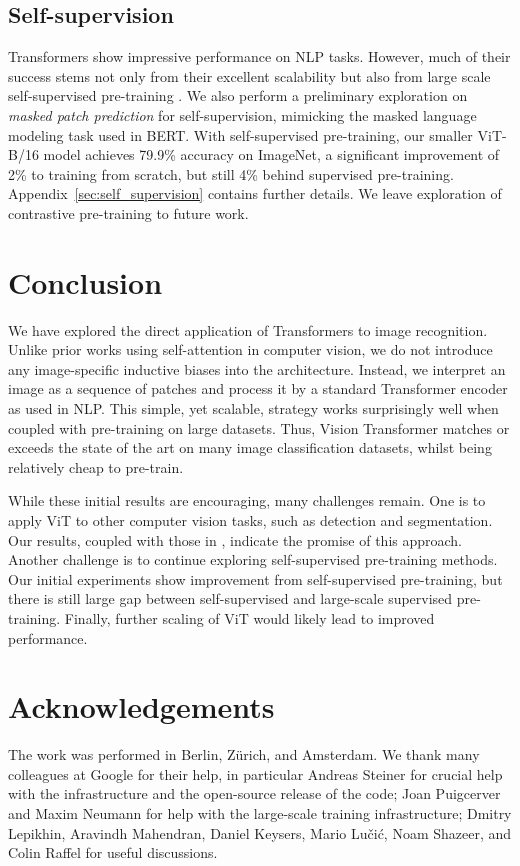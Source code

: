 \documentclass{article} \usepackage{iclr2021_conference,times}
\newcommand{\oursabbrv}{ViT\xspace}
\newcommand{\oursfull}{Vision Transformer\xspace}
\newcommand{\imagenet}{ImageNet\xspace}
\begin{document}
\subsection{Self-supervision}
Transformers show impressive performance on NLP tasks. However, much of their success stems not only from their excellent scalability but also from large scale self-supervised pre-training \citep{devlin19-bert,radford2018-gpt}. We also perform a preliminary exploration on \textit{masked patch prediction} for self-supervision, mimicking the masked language modeling task used in BERT. With self-supervised pre-training, our smaller \oursabbrv-B/16 model achieves 79.9\% accuracy on \imagenet{}, a significant improvement of 2\% to training from scratch, but still 4\% behind supervised pre-training. Appendix~\ref{sec:self_supervision} contains further details.
We leave exploration of contrastive pre-training \citep{Chen2020simclr,he2020moco,bachman2019amdim,henaff2020cpc} to future work.




 \section{Conclusion}

We have explored the direct application of Transformers to image recognition.
Unlike prior works using self-attention in computer vision, we do not introduce any image-specific inductive biases into the architecture.
Instead, we interpret an image as a sequence of patches and process it by a standard Transformer encoder as used in NLP.
This simple, yet scalable, strategy works surprisingly well when coupled with pre-training on large datasets.
Thus, \oursfull matches or exceeds the state of the art on many image classification datasets, whilst being relatively cheap to pre-train.

While these initial results are encouraging, many challenges remain.
One is to apply \oursabbrv to other computer vision tasks, such as detection and segmentation.
Our results, coupled with those in \citet{carion20-detr}, indicate the promise of this approach.
Another challenge is to continue exploring self-supervised pre-training methods.
Our initial experiments show improvement from self-supervised pre-training, but there is still large gap between self-supervised and large-scale supervised pre-training.
Finally, further scaling of \oursabbrv{} would likely lead to improved performance. 
\section*{Acknowledgements}
The work was performed in Berlin, Z\"urich, and Amsterdam. We thank many colleagues at Google for their help, in particular Andreas Steiner for crucial help with the infrastructure and the open-source release of the code; Joan Puigcerver and Maxim Neumann for help with the large-scale training infrastructure; Dmitry Lepikhin, Aravindh Mahendran, Daniel Keysers, Mario Lu\v{c}i\'{c}, Noam Shazeer, and Colin Raffel for useful discussions.
\end{document}
